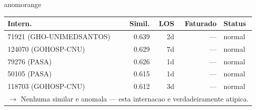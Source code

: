 \documentclass[a4paper,10pt]{article}
\begin{document}
\begin{anomalycard}[Internacao 163837 | GHO-PETROBRAS | ALTO (z=3.08)]{anomorange}
\begin{tabular}{l r r r l}\toprule\textbf{Intern.} & \textbf{Simil.} & \textbf{LOS} & \textbf{Faturado} & \textbf{Status} \\\midrule
71921 (GHO-UNIMEDSANTOS) & 0.639 & 2d & --- & \textcolor{jcubeblue}{normal} \\
124070 (GOHOSP-CNU) & 0.629 & 7d & --- & \textcolor{jcubeblue}{normal} \\
79276 (PASA) & 0.626 & 1d & --- & \textcolor{jcubeblue}{normal} \\
50105 (PASA) & 0.615 & 1d & --- & \textcolor{jcubeblue}{normal} \\
118703 (GOHOSP-CNU) & 0.612 & 3d & --- & \textcolor{jcubeblue}{normal} \\
\multicolumn{5}{l}{\textcolor{jcubeblue}{\small $\rightarrow$ Nenhuma similar e anomala --- esta internacao e verdadeiramente atipica.}} \\
\bottomrule\end{tabular}


\end{anomalycard}

\newpage
\end{document}
